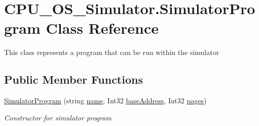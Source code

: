 \hypertarget{class_c_p_u___o_s___simulator_1_1_simulator_program}{}\section{C\+P\+U\+\_\+\+O\+S\+\_\+\+Simulator.\+Simulator\+Program Class Reference}
\label{class_c_p_u___o_s___simulator_1_1_simulator_program}


This class represents a program that can be run within the simulator  


\subsection*{Public Member Functions}
\begin{DoxyCompactItemize}
\item 
\hyperlink{class_c_p_u___o_s___simulator_1_1_simulator_program_acc1a7ef72ae0772854ad7b5785af4424}{Simulator\+Program} (string \hyperlink{class_c_p_u___o_s___simulator_1_1_simulator_program_a01c3215b15e9c8e8502f35e7c8e574bd}{name}, Int32 \hyperlink{class_c_p_u___o_s___simulator_1_1_simulator_program_a71863cf3341045e483ccc52778d3ccc5}{base\+Address}, Int32 \hyperlink{class_c_p_u___o_s___simulator_1_1_simulator_program_afff0a397a56b58714cf979f5fe7b55da}{pages})
\begin{DoxyCompactList}\small\item\em Constructor for simulator program \end{DoxyCompactList}\end{DoxyCompactItemize}
